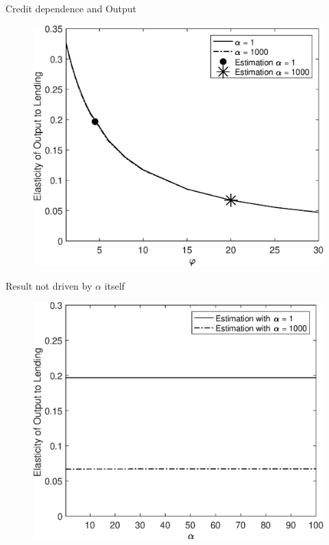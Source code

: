 \documentclass[english,xcolor=svgnames]{beamer}
\begin{document}
\begin{frame}{Credit dependence and Output}
\begin{figure}
\includegraphics[scale=0.5]{Figures/output_loop_varpsi.eps}
\end{figure}
\end{frame}




\begin{frame}{Result not driven by $\alpha$ itself}
\begin{figure}
\includegraphics[scale=0.5]{Figures/output_loop_alpha.eps}
\end{figure}
\end{frame}
\end{document}
